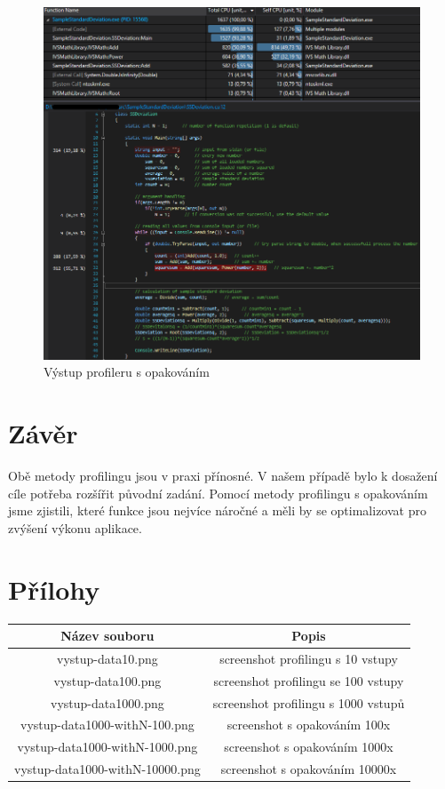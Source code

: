 \documentclass{article}
\begin{document}
\begin{figure}[h]
\centering
\includegraphics[scale=0.54]{vystup-data1000-withN-10000}
\caption{Výstup profileru s opakováním}
\label{profiler:data1000-withN-10000}
\end{figure}

\section{Závěr}
Obě metody profilingu jsou v praxi přínosné. V našem případě bylo k dosažení cíle potřeba rozšířit původní zadání. Pomocí metody profilingu s opakováním jsme zjistili, které funkce jsou nejvíce náročné a měli by se optimalizovat pro zvýšení výkonu aplikace.

\section{Přílohy}
\begin{tabular}[pos]{ | c | c |}
\hline
{\bf Název souboru} & {\bf Popis} \\
\hline
vystup-data10.png & screenshot profilingu s 10 vstupy \\
\hline
vystup-data100.png & screenshot profilingu se 100 vstupy \\
\hline
vystup-data1000.png & screenshot profilingu s 1000 vstupů \\
\hline
vystup-data1000-withN-100.png & screenshot s opakováním 100x \\
\hline
vystup-data1000-withN-1000.png & screenshot s opakováním 1000x \\
\hline
vystup-data1000-withN-10000.png & screenshot s opakováním 10000x \\
\hline
\end{tabular}
\end{document}
